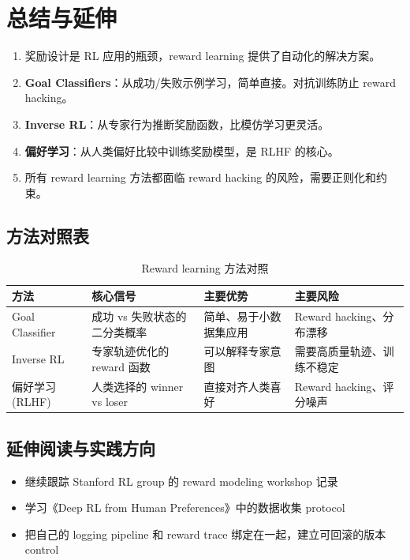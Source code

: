 \documentclass[a4paper]{article}
\begin{document}
\section{总结与延伸}

\begin{enumerate}
    \item 奖励设计是 RL 应用的瓶颈，reward learning 提供了自动化的解决方案。
    \item \textbf{Goal Classifiers}：从成功/失败示例学习，简单直接。对抗训练防止 reward hacking。
    \item \textbf{Inverse RL}：从专家行为推断奖励函数，比模仿学习更灵活。
    \item \textbf{偏好学习}：从人类偏好比较中训练奖励模型，是 RLHF 的核心。
    \item 所有 reward learning 方法都面临 reward hacking 的风险，需要正则化和约束。
\end{enumerate}

\subsection{方法对照表}

\begin{table}[H]
\centering
\begin{tabular}{p{} p{} p{} p{}}
\toprule
方法 & 核心信号 & 主要优势 & 主要风险 \\
\midrule
Goal Classifier & 成功 vs 失败状态的二分类概率 & 简单、易于小数据集应用 & Reward hacking、分布漂移 \\
Inverse RL & 专家轨迹优化的 reward 函数 & 可以解释专家意图 & 需要高质量轨迹、训练不稳定 \\
偏好学习 (RLHF) & 人类选择的 winner vs loser & 直接对齐人类喜好 & Reward hacking、评分噪声 \\
\bottomrule
\end{tabular}
\caption{Reward learning 方法对照}
\end{table}

\subsection{延伸阅读与实践方向}

\begin{itemize}
    \item 继续跟踪 Stanford RL group 的 reward modeling workshop 记录
    \item 学习《Deep RL from Human Preferences》中的数据收集 protocol
    \item 把自己的 logging pipeline 和 reward trace 绑定在一起，建立可回滚的版本 control
\end{itemize}
\end{document}
